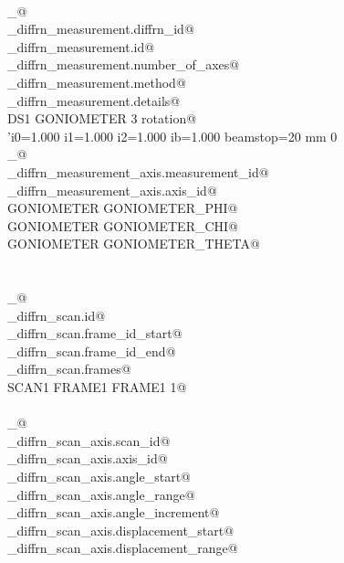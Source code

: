 \documentclass[10pt,a4paper,twoside,notitlepage]{article}
\begin{document}
\begin{flushleft}
\begin{list}{}{}
\mbox{}\verb@@\\
\mbox{}\verb@loop_@\\
\mbox{}\verb@_diffrn_measurement.diffrn_id@\\
\mbox{}\verb@_diffrn_measurement.id@\\
\mbox{}\verb@_diffrn_measurement.number_of_axes@\\
\mbox{}\verb@_diffrn_measurement.method@\\
\mbox{}\verb@_diffrn_measurement.details@\\
\mbox{}\verb@ DS1 GONIOMETER 3 rotation@\\
\mbox{}\verb@ 'i0=1.000 i1=1.000 i2=1.000 ib=1.000 beamstop=20 mm 0% attenuation'@\\
\mbox{}\verb@@\\
\mbox{}\verb@loop_@\\
\mbox{}\verb@_diffrn_measurement_axis.measurement_id@\\
\mbox{}\verb@_diffrn_measurement_axis.axis_id@\\
\mbox{}\verb@ GONIOMETER GONIOMETER_PHI@\\
\mbox{}\verb@ GONIOMETER GONIOMETER_CHI@\\
\mbox{}\verb@ GONIOMETER GONIOMETER_THETA@\\
\mbox{}\verb@@\\
\mbox{}\verb@@\\
\mbox{}\verb@loop_@\\
\mbox{}\verb@_diffrn_scan.id@\\
\mbox{}\verb@_diffrn_scan.frame_id_start@\\
\mbox{}\verb@_diffrn_scan.frame_id_end@\\
\mbox{}\verb@_diffrn_scan.frames@\\
\mbox{}\verb@ SCAN1 FRAME1 FRAME1 1@\\
\mbox{}\verb@@\\
\mbox{}\verb@loop_@\\
\mbox{}\verb@_diffrn_scan_axis.scan_id@\\
\mbox{}\verb@_diffrn_scan_axis.axis_id@\\
\mbox{}\verb@_diffrn_scan_axis.angle_start@\\
\mbox{}\verb@_diffrn_scan_axis.angle_range@\\
\mbox{}\verb@_diffrn_scan_axis.angle_increment@\\
\mbox{}\verb@_diffrn_scan_axis.displacement_start@\\
\mbox{}\verb@_diffrn_scan_axis.displacement_range@\\

\end{list}
\end{flushleft}
\end{document}
